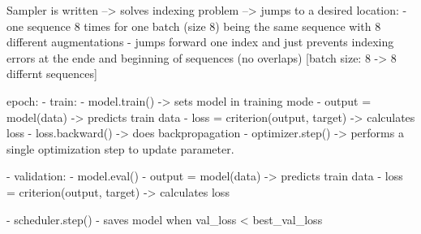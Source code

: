 Sampler is written --> solves indexing problem
--> jumps to a desired location:
    - one sequence 8 times for one batch (size 8) being the same sequence with 8 different augmentations
    - jumps forward one index and just prevents indexing errors at the ende and beginning of sequences (no overlaps) [batch size: 8 -> 8 differnt sequences]

epoch:
- train:
    - model.train() -> sets model in training mode
    - output = model(data) -> predicts train data
    - loss = criterion(output, target) -> calculates loss
    - loss.backward() -> does backpropagation
    - optimizer.step() -> performs a single optimization step to update parameter.

- validation:
    - model.eval()
    - output = model(data) -> predicts train data
    - loss = criterion(output, target) -> calculates loss

- scheduler.step()
- saves model when val\_loss < best\_val\_loss